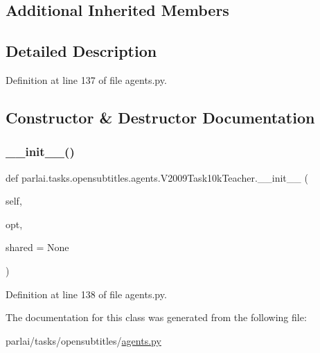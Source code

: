 \subsection*{Additional Inherited Members}


\subsection{Detailed Description}


Definition at line 137 of file agents.\+py.



\subsection{Constructor \& Destructor Documentation}
\mbox{\label{classparlai_1_1tasks_1_1opensubtitles_1_1agents_1_1V2009Task10kTeacher_af0a8a8e3a7a2c7b7cea42965f8b08afc}} 
\subsubsection{\texorpdfstring{\+\_\+\+\_\+init\+\_\+\+\_\+()}{\_\_init\_\_()}}
{\footnotesize\ttfamily def parlai.\+tasks.\+opensubtitles.\+agents.\+V2009\+Task10k\+Teacher.\+\_\+\+\_\+init\+\_\+\+\_\+ (\begin{DoxyParamCaption}\item[{}]{self,  }\item[{}]{opt,  }\item[{}]{shared = {\ttfamily None} }\end{DoxyParamCaption})}



Definition at line 138 of file agents.\+py.



The documentation for this class was generated from the following file\+:\begin{DoxyCompactItemize}
\item 
parlai/tasks/opensubtitles/\hyperlink{parlai_2tasks_2opensubtitles_2agents_8py}{agents.\+py}\end{DoxyCompactItemize}

